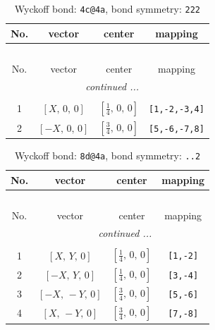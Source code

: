 \documentclass[fleqn,8pt]{jsarticle}
\begin{document}
\renewcommand{\arraystretch}{1.2}
\begin{longtable}{cccc}
\caption{Wyckoff bond: {\tt 4c@4a}, bond symmetry: {\tt 222}}
 \\
 \hline \hline
No. & vector & center & mapping \\ \hline \endfirsthead

\multicolumn{3}{l}{\tablename\ \thetable{}} \\
 \hline \hline
No. & vector & center & mapping \\ \hline \endhead

 \hline \hline
\multicolumn{3}{r}{\footnotesize\it continued ...} \\ \endfoot

 \hline \hline
\multicolumn{3}{r}{} \\ \endlastfoot

1 & $\left[ X,\, 0,\, 0 \right]$ & $\left[ \frac{1}{4},\, 0,\, 0 \right]$ & {\tt [1,-2,-3,4]} \\ \hline
2 & $\left[ - X,\, 0,\, 0 \right]$ & $\left[ \frac{3}{4},\, 0,\, 0 \right]$ & {\tt [5,-6,-7,8]} \\
\end{longtable}
\renewcommand{\arraystretch}{1.2}
\begin{longtable}{cccc}
\caption{Wyckoff bond: {\tt 8d@4a}, bond symmetry: {\tt ..2}}
 \\
 \hline \hline
No. & vector & center & mapping \\ \hline \endfirsthead

\multicolumn{3}{l}{\tablename\ \thetable{}} \\
 \hline \hline
No. & vector & center & mapping \\ \hline \endhead

 \hline \hline
\multicolumn{3}{r}{\footnotesize\it continued ...} \\ \endfoot

 \hline \hline
\multicolumn{3}{r}{} \\ \endlastfoot

1 & $\left[ X,\, Y,\, 0 \right]$ & $\left[ \frac{1}{4},\, 0,\, 0 \right]$ & {\tt [1,-2]} \\ \hline
2 & $\left[ - X,\, Y,\, 0 \right]$ & $\left[ \frac{1}{4},\, 0,\, 0 \right]$ & {\tt [3,-4]} \\ \hline
3 & $\left[ - X,\, - Y,\, 0 \right]$ & $\left[ \frac{3}{4},\, 0,\, 0 \right]$ & {\tt [5,-6]} \\ \hline
4 & $\left[ X,\, - Y,\, 0 \right]$ & $\left[ \frac{3}{4},\, 0,\, 0 \right]$ & {\tt [7,-8]} \\
\end{longtable}
\end{document}
